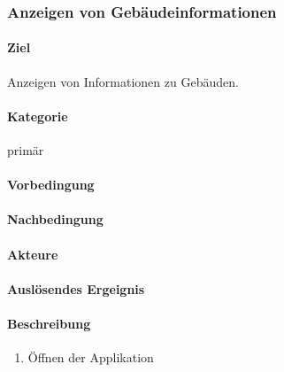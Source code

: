 \subsubsection{Anzeigen von Gebäudeinformationen}
\paragraph{Ziel}
Anzeigen von Informationen zu Gebäuden.
\paragraph{Kategorie}
primär
\paragraph{Vorbedingung}

\paragraph{Nachbedingung}

\paragraph{Akteure}

\paragraph{Auslösendes Ergeignis}

\paragraph{Beschreibung}
\begin{enumerate}
    \item Öffnen der Applikation
\end{enumerate}